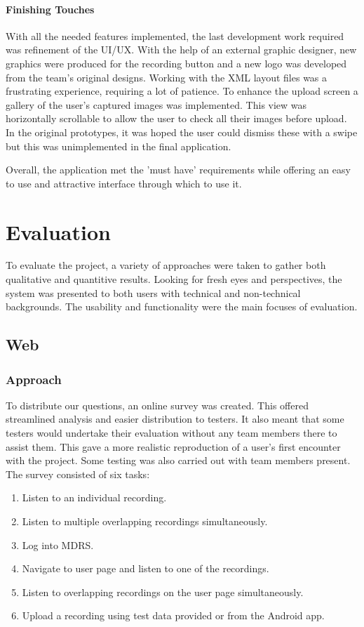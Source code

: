 \documentclass{l3proj}
\begin{document}
\subsubsection{Finishing Touches}
With all the needed features implemented, the last development work required was refinement of the UI/UX. With the help of an external graphic designer, new graphics were produced for the recording button and a new logo was developed from the team's original designs. Working with the XML layout files was a frustrating experience, requiring a lot of patience. To enhance the upload screen a gallery of the user's captured images was implemented. This view was horizontally scrollable to allow the user to check all their images before upload. In the original prototypes, it was hoped the user could dismiss these with a swipe but this was unimplemented in the final application.

Overall, the application met the 'must have' requirements while offering an easy to use and attractive interface through which to use it.

\chapter{Evaluation}

To evaluate the project, a variety of approaches were taken to gather both qualitative and quantitive results. Looking for fresh eyes and perspectives, the system was presented to both users with technical and non-technical backgrounds. The usability and functionality were the main focuses of evaluation.

\section{Web}
\subsection{Approach}		To distribute our questions, an online survey was created. This offered streamlined analysis and easier distribution to testers. It also meant that some testers would undertake their evaluation without any team members there to assist them. This gave a more realistic reproduction of a user's first encounter with the project. Some testing was also carried out with team members present. The survey consisted of six tasks:

\begin{enumerate}
\item{Listen to an individual recording.}
\item{Listen to multiple overlapping recordings simultaneously.}
\item{Log into MDRS.}
\item{Navigate to user page and listen to one of the recordings.}
\item{Listen to overlapping recordings on the user page simultaneously.}
\item{Upload a recording using test data provided or from the Android app.}
\end{enumerate}
\end{document}
